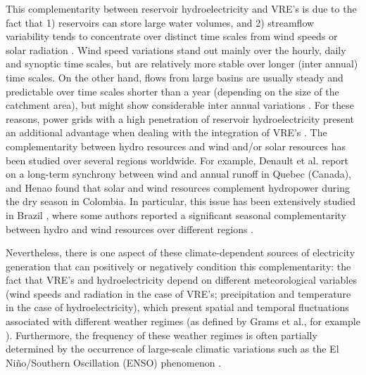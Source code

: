 \documentclass[AMA,Times1COL]{WileyNJDv5} %
\begin{document}
\begin{linenumbers}
This complementarity between reservoir hydroelectricity and VRE's is due to the fact that 1) reservoirs can store large water volumes, and 2) streamflow variability tends to concentrate over distinct time scales from wind speeds or solar radiation \cite{wan1993factors}. Wind speed variations stand out mainly over the hourly, daily and synoptic time scales, but are relatively more stable over longer (inter annual) time scales. On the other hand, flows from large basins are usually steady and predictable over time scales shorter than a year (depending on the size of the catchment area), but might show considerable inter annual variations \cite{acker2012integration, soberanis2015regarding}. For these reasons, power grids with a high penetration of reservoir hydroelectricity present an additional advantage when dealing with the integration of VRE's \cite{wan1993factors, acker2012integration, gullberg2013political}. The complementarity between hydro resources and wind and/or solar resources has been studied over several regions worldwide. For example, Denault et al. \cite{denault2009complementarity} report on a long-term synchrony between wind and annual runoff in Quebec (Canada), and Henao \cite{henao2020annual} found that solar and wind resources complement hydropower during the dry season in Colombia. In particular, this issue has been extensively studied in Brazil \cite{ricosti2013assessment, schmidt2016optimal}, where some authors reported a significant seasonal complementarity between hydro and wind resources over different regions \cite{do2000wind, silva2016complementarity, cantao2017evaluation}.

Nevertheless, there is one aspect of these climate-dependent sources of electricity generation that can positively or negatively condition this complementarity: the fact that VRE's and hydroelectricity depend on different meteorological variables (wind speeds and radiation in the case of VRE's; precipitation and temperature in the case of hydroelectricity), which present spatial and temporal fluctuations associated with different weather regimes (as defined by Grams et al., for example \cite{grams2017balancing}). Furthermore, the frequency of these weather regimes is often partially determined by the occurrence of large-scale climatic variations such as the El Niño/Southern Oscillation (ENSO) phenomenon \cite{bridgman2014global}. 


\end{linenumbers}
\end{document}
